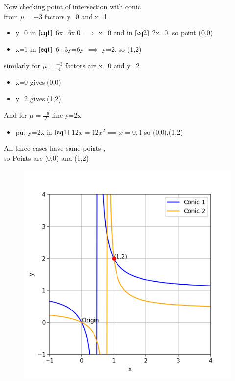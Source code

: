 \documentclass[a5paper,10pt]{article}
\begin{document}
Now checking point of intersection with conic\\
from $\mu=-3$ factors y=0 and x=1
\begin{itemize}
    \item y=0 in $\eqref{eq1}$ 6x=6x.0 $\implies$ x=0 and in $\eqref{eq2}$ 2x=0, so point (0,0)
    \item x=1 in $\eqref{eq1}$ 6+3y=6y $\implies$ y=2, so (1,2)
\end{itemize}
similarly for $\mu=\frac{-3}{4}$ factors are x=0 and y=2
\begin{itemize}
    \item x=0 gives (0,0)
    \item y=2 gives (1,2)
\end{itemize}
And for $\mu=\frac{-6}{5}$ line y=2x
\begin{itemize}
    \item put y=2x in $\eqref{eq1}$ $12x=12x^2\implies x=0 ,1$ so (0,0),(1,2)
\end{itemize}
All three cases have same points ,\\so Points are (0,0) and (1,2)
\newpage
\begin{figure}[H]
    \centering
    \includegraphics[width=\columnwidth]{figs/figure.png}
    \caption{}
    \label{fig:placeholder}
\end{figure}
\end{document}
